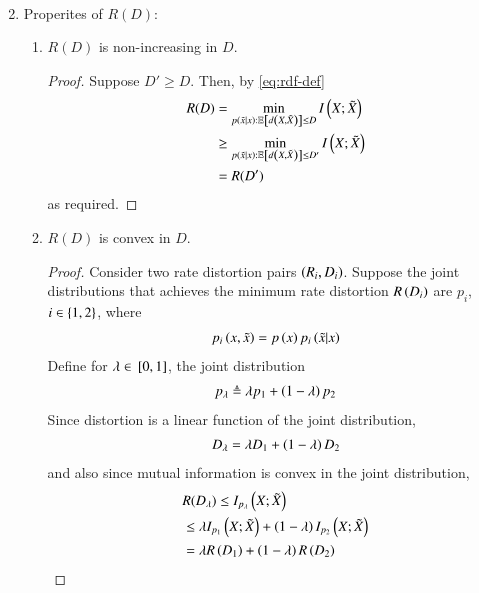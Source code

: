 \documentclass[journal,12pt,twocolumn]{IEEEtran}
\renewcommand\thesection{\arabic{section}}
\begin{document}
\begin{enumerate}[label=\thesection.\arabic*, ref=\thesection.\theenumi]
\begin{align}
    \end{align}
    \item Properites of $R(D)$:
    \begin{enumerate}
        \item $R(D)$ is non-increasing in $D$.
        \begin{proof}
            Suppose $D' \ge D$. Then, by \eqref{eq:rdf-def}
            \begin{align}
                R(D) &= \min_{p\left(\tilde{x}|x\right):\mathbb{E}\left[d\left(X,\tilde{X}\right)\right] \le D} I\left(X;\tilde{X}\right) \\
                &\ge \min_{p\left(\tilde{x}|x\right):\mathbb{E}\left[d\left(X,\tilde{X}\right)\right] \le D'} I\left(X;\tilde{X}\right) \\
                &= R(D')
            \end{align}
            as required.
        \end{proof}
        \item $R(D)$ is convex in $D$.
        \begin{proof}
            Consider two rate distortion pairs $\left(R_i,D_i\right)$. Suppose the 
            joint distributions that achieves the minimum rate distortion 
            $R\left(D_i\right)$ are $p_i$, $i \in \left\{1,2\right\}$, where
            \begin{align}
                p_i\left(x,\tilde{x}\right) = p\left(x\right)p_i\left(\tilde{x}|x\right)
            \end{align}
            Define for $\lambda \in {}\left[0,1\right]$, the joint distribution
            \begin{align}
                p_{\lambda} \triangleq \lambda p_1 + \left(1-\lambda\right)p_2
            \end{align}
            Since distortion is a linear function of the joint distribution,
            \begin{align}
                D_\lambda = \lambda D_1 + \left(1-\lambda\right)D_2
            \end{align}
            and also since mutual information is convex in the joint distribution,
            \begin{align}
                &R(D_\lambda) \le I_{p_\lambda}\left(X;\tilde{X}\right) \\
                &\le \lambda I_{p_1}\left(X;\tilde{X}\right) + \left(1-\lambda\right) I_{p_2}\left(X;\tilde{X}\right) \\
                &= \lambda R\left(D_1\right) + \left(1-\lambda\right)R\left(D_2\right)
                \label{eq:rdf-cvx}
            \end{align}

\end{proof}
\end{enumerate}
\end{enumerate}
\end{document}
